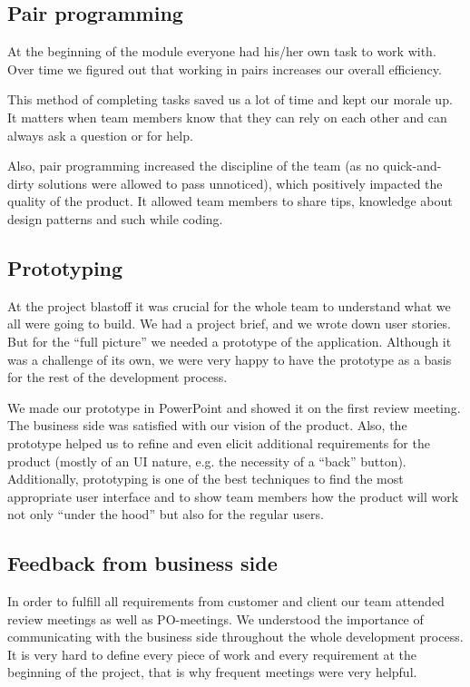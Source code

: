 \subsection{Pair programming}
At the beginning of the module everyone had his/her own task to work with. Over time we figured out that working in pairs increases our overall efficiency.

This method of completing tasks saved us a lot of time and kept our morale up. It matters when team members know that they can rely on each other and can always ask a question or for help.

Also, pair programming increased the discipline of the team (as no quick-and-dirty solutions were allowed to pass unnoticed), which positively impacted the quality of the product. It allowed team members to share tips, knowledge about design patterns and such while coding.

\subsection{Prototyping}
At the project blastoff it was crucial for the whole team to understand what we all were going to build. We had a project brief, and we wrote down user stories. But for the “full picture” we needed a prototype of the application. Although it was a challenge of its own, we were very happy to have the prototype as a basis for the rest of the development process.

We made our prototype in PowerPoint and showed it on the first review meeting. The business side was satisfied with our vision of the product. Also, the prototype helped us to refine and even elicit additional requirements for the product (mostly of an UI nature, e.g. the necessity of a “back” button). Additionally, prototyping is one of the best techniques to find the most appropriate user interface and to show team members how the product will work not only “under the hood” but also for the regular users.

\subsection{Feedback from business side}
In order to fulfill all requirements from customer and client our team attended review meetings as well as PO-meetings. We understood the importance of communicating with the business side throughout the whole development process. It is very hard to define every piece of work and every requirement at the beginning of the project, that is why frequent meetings were very helpful.

